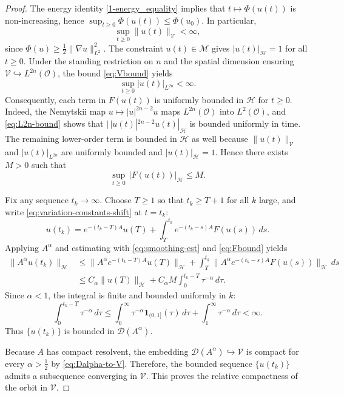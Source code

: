 \documentclass[reqno]{amsart}
\begin{document}
\begin{proof}
The energy identity \eqref{1-energy_equality} implies that $t\mapsto \Phi(u(t))$ is
non-increasing,
hence $\sup_{t\ge 0}\Phi(u(t))\le \Phi(u_0)$. In particular,
\begin{equation}\label{eq:Vbound}
\sup_{t\ge 0}\|u(t)\|_{\mathcal V}<\infty,
\end{equation}
since $\Phi(u)\ge \frac12\|\nabla u\|_{L^2}^2$. The constraint $u(t)\in\mathcal M$ gives
$|u(t)|_{\mathcal H}=1$ for all $t\ge 0$. Under the standing restriction on $n$ and the
spatial dimension ensuring $\mathcal V\hookrightarrow L^{2n}(\mathcal O)$,
the bound \eqref{eq:Vbound} yields
\begin{equation}\label{eq:L2n-bound}
\sup_{t\ge 0} |u(t)|_{L^{2n}}<\infty.
\end{equation}
Consequently, each term in $F(u(t))$ is uniformly bounded in $\mathcal H$ for $t\ge 0$.
Indeed, the Nemytskii map $u\mapsto |u|^{2n-2}u$ maps $L^{2n}(\mathcal O)$ into
$L^2(\mathcal O)$, and \eqref{eq:L2n-bound} shows that
$|\,|u(t)|^{2n-2}u(t)|_{\mathcal H}$ is bounded uniformly in
time. The remaining lower-order term is bounded in $\mathcal H$ as well because
$\|u(t)\|_{\mathcal V}$ and $|u(t)|_{L^{2n}}$ are uniformly bounded and
$|u(t)|_{\mathcal H}=1$.
Hence there exists $M>0$ such that
\begin{equation}\label{eq:Fbound}
\sup_{t\ge 0}\,|F(u(t))|_{\mathcal H}\le M.
\end{equation}

Fix any sequence $t_k\to\infty$. Choose $T\ge 1$ so that $t_k\ge T+1$ for all $k$ large,
and write
\eqref{eq:variation-constants-shift} at $t=t_k$:
\begin{equation}\label{eq:decomp-tk}
u(t_k)=e^{-(t_k-T)A}u(T)+\int_T^{t_k} e^{-(t_k-s)A}F(u(s))\,ds.
\end{equation}
Applying $A^\alpha$ and estimating with \eqref{eq:smoothing-est} and
\eqref{eq:Fbound} yields
\begin{align*}
\|A^\alpha u(t_k)\|_{\mathcal H}
&\le \|A^\alpha e^{-(t_k-T)A}u(T)\|_{\mathcal H}
     +\int_T^{t_k}\|A^\alpha e^{-(t_k-s)A}F(u(s))\|_{\mathcal H}\,ds\\
&\le C_\alpha\|u(T)\|_{\mathcal H}+ C_\alpha M\int_0^{t_k-T} \tau^{-\alpha}\,d\tau.
\end{align*}
Since $\alpha<1$, the integral is finite and bounded uniformly in $k$:
\[
\int_0^{t_k-T}\tau^{-\alpha}\,d\tau
\le \int_0^{\infty}\tau^{-\alpha}\mathbf 1_{(0,1]}(\tau)\,d\tau
+\int_1^\infty \tau^{-\alpha}\,d\tau <\infty.
\]
Thus $\{u(t_k)\}$ is bounded in $\mathcal D(A^\alpha)$.

Because $A$ has compact resolvent, the embedding
$\mathcal D(A^\alpha)\hookrightarrow \mathcal V$
is compact for every $\alpha>\frac12$ by \eqref{eq:Dalpha-to-V}.
Therefore, the bounded sequence
$\{u(t_k)\}$ admits a subsequence converging in $\mathcal V$.
This proves the relative compactness
of the orbit in $\mathcal V$.
\end{proof}
\end{document}
